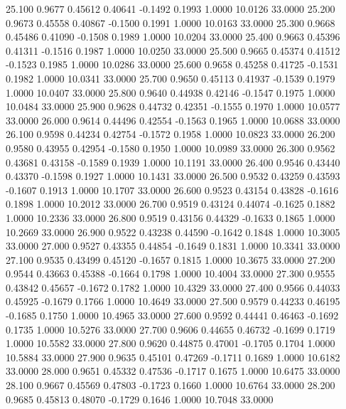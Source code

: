   25.100   0.9677   0.45612   0.40641  -0.1492   0.1993   1.0000  10.0126  33.0000
  25.200   0.9673   0.45558   0.40867  -0.1500   0.1991   1.0000  10.0163  33.0000
  25.300   0.9668   0.45486   0.41090  -0.1508   0.1989   1.0000  10.0204  33.0000
  25.400   0.9663   0.45396   0.41311  -0.1516   0.1987   1.0000  10.0250  33.0000
  25.500   0.9665   0.45374   0.41512  -0.1523   0.1985   1.0000  10.0286  33.0000
  25.600   0.9658   0.45258   0.41725  -0.1531   0.1982   1.0000  10.0341  33.0000
  25.700   0.9650   0.45113   0.41937  -0.1539   0.1979   1.0000  10.0407  33.0000
  25.800   0.9640   0.44938   0.42146  -0.1547   0.1975   1.0000  10.0484  33.0000
  25.900   0.9628   0.44732   0.42351  -0.1555   0.1970   1.0000  10.0577  33.0000
  26.000   0.9614   0.44496   0.42554  -0.1563   0.1965   1.0000  10.0688  33.0000
  26.100   0.9598   0.44234   0.42754  -0.1572   0.1958   1.0000  10.0823  33.0000
  26.200   0.9580   0.43955   0.42954  -0.1580   0.1950   1.0000  10.0989  33.0000
  26.300   0.9562   0.43681   0.43158  -0.1589   0.1939   1.0000  10.1191  33.0000
  26.400   0.9546   0.43440   0.43370  -0.1598   0.1927   1.0000  10.1431  33.0000
  26.500   0.9532   0.43259   0.43593  -0.1607   0.1913   1.0000  10.1707  33.0000
  26.600   0.9523   0.43154   0.43828  -0.1616   0.1898   1.0000  10.2012  33.0000
  26.700   0.9519   0.43124   0.44074  -0.1625   0.1882   1.0000  10.2336  33.0000
  26.800   0.9519   0.43156   0.44329  -0.1633   0.1865   1.0000  10.2669  33.0000
  26.900   0.9522   0.43238   0.44590  -0.1642   0.1848   1.0000  10.3005  33.0000
  27.000   0.9527   0.43355   0.44854  -0.1649   0.1831   1.0000  10.3341  33.0000
  27.100   0.9535   0.43499   0.45120  -0.1657   0.1815   1.0000  10.3675  33.0000
  27.200   0.9544   0.43663   0.45388  -0.1664   0.1798   1.0000  10.4004  33.0000
  27.300   0.9555   0.43842   0.45657  -0.1672   0.1782   1.0000  10.4329  33.0000
  27.400   0.9566   0.44033   0.45925  -0.1679   0.1766   1.0000  10.4649  33.0000
  27.500   0.9579   0.44233   0.46195  -0.1685   0.1750   1.0000  10.4965  33.0000
  27.600   0.9592   0.44441   0.46463  -0.1692   0.1735   1.0000  10.5276  33.0000
  27.700   0.9606   0.44655   0.46732  -0.1699   0.1719   1.0000  10.5582  33.0000
  27.800   0.9620   0.44875   0.47001  -0.1705   0.1704   1.0000  10.5884  33.0000
  27.900   0.9635   0.45101   0.47269  -0.1711   0.1689   1.0000  10.6182  33.0000
  28.000   0.9651   0.45332   0.47536  -0.1717   0.1675   1.0000  10.6475  33.0000
  28.100   0.9667   0.45569   0.47803  -0.1723   0.1660   1.0000  10.6764  33.0000
  28.200   0.9685   0.45813   0.48070  -0.1729   0.1646   1.0000  10.7048  33.0000

